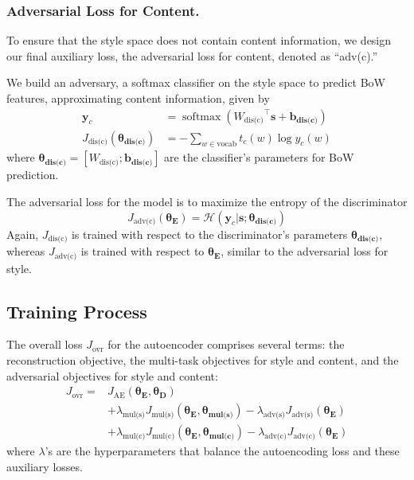 \documentclass[letterpaper]{article} %
\newcommand{\loss}[1]{J_{\text{#1}}}
\newcommand{\hyp}[1]{\lambda_{\text{#1}}}
\newcommand{\nnweight}[1]{\bm{\theta_{\text{#1}}}}
\newcommand{\weight}[1]{W_{\text{#1}}}
\newcommand{\bias}[1]{\bm{b_{\text{#1}}}}
\begin{document}
\subsubsection{Adversarial Loss for Content.} \label{ssec:adversarial-content-objective}

To ensure that the style space does not contain content information, we design our final auxiliary loss, the adversarial loss for content, denoted as ``adv(c).''

We build an adversary, a softmax classifier on the style space to predict BoW features, approximating content information, given by
\begin{align}
	\label{eqn:adv-bow-disc-loss}
	\bm y_c                          & = \operatorname{softmax}({\weight{dis(c)}}^\top \bm s + \bias{dis(c)}) \\
	\loss{dis(c)}(\nnweight{dis(c)}) & = - \sum\nolimits_{w\in\text{vocab}} t_c(w)\log y_c(w)
\end{align}
where $\nnweight{dis(c)}=[\weight{dis(c)}; \bias{dis(c)}]$ are the classifier's parameters for BoW prediction.

The adversarial loss for the model is to maximize the entropy of the discriminator
\begin{equation}
	\loss{adv(c)}(\nnweight{E}) = \mathcal{H}(\bm y_c | \bm s; \nnweight{dis(c)})
\end{equation}
Again, $\loss{dis(c)}$ is trained with respect to the discriminator's parameters $\nnweight{dis(c)}$, whereas $\loss{adv(c)}$ is trained with respect to $\nnweight{E}$, similar to the adversarial loss for style.



\subsection{Training Process}

The overall loss $\loss{ovr}$ for the autoencoder comprises several terms: the reconstruction objective, the multi-task objectives for style and content, and the adversarial objectives for style and content:
\begin{align}
	\loss{ovr} = & \loss{AE}(\nnweight{E}, \nnweight{D})                                                                              \\
	             & + \hyp{mul(s)} \loss{mul(s)} (\nnweight{E},\nnweight{mul(s)}) - \hyp{adv(s)} \loss{adv(s)}(\nnweight{E}) \nonumber \\
	             & + \hyp{mul(c)} \loss{mul(c)} (\nnweight{E},\nnweight{mul(c)}) - \hyp{adv(c)} \loss{adv(c)}(\nnweight{E}) \nonumber
\end{align}
where $\lambda$'s are the hyperparameters that balance the autoencoding loss and these auxiliary losses.
\end{document}
